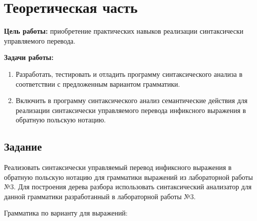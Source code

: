 \chapter{Теоретическая часть}

\textbf{Цель работы:} приобретение практических навыков реализации синтаксически управляемого перевода.

\textbf{Задачи работы:}

\begin{enumerate}
	\item Разработать, тестировать и отладить программу синтаксического анализа в соответствии с предложенным вариантом грамматики.
	\item Включить в программу синтаксического анализ семантические действия для реализации синтаксически управляемого перевода инфиксного выражения в обратную польскую нотацию.
\end{enumerate}

\section{Задание}

Реализовать синтаксически управляемый перевод инфиксного выражения в обратную польскую нотацию для грамматики выражений из лабораторной работы №3. Для построения дерева разбора использовать синтаксический анализатор для данной грамматики разработанный в лабораторной работы №3.

Грамматика по варианту для выражений:

